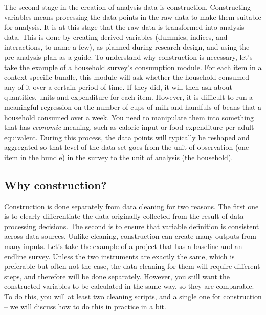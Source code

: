 The second stage in the creation of analysis data is construction.
Constructing variables means processing the data points in the raw data to make them suitable for analysis.
It is at this stage that the raw data is transformed into analysis data.
This is done by creating derived variables (dummies, indices, and interactions, to name a few), 
as planned during research design, 
and using the pre-analysis plan as a guide.
To understand why construction is necessary,
let's take the example of a household survey's consumption module.
For each item in a context-specific bundle, 
this module will ask whether the household consumed any of it over a certain period of time.
If they did, it will then ask about quantities, units and expenditure for each item.
However, it is difficult to run a meaningful regression 
on the number of cups of milk and handfuls of beans that a household consumed over a week.
You need to manipulate them into something that has \textit{economic} meaning,
such as caloric input or food expenditure per adult equivalent. 
During this process, the data points will typically be reshaped and aggregated 
so that level of the data set goes from the unit of observation 
(one item in the bundle) in the survey to the unit of analysis (the household). 

\subsection{Why construction?}

Construction is done separately from data cleaning for two reasons. 
The first one is to clearly differentiate the data originally collected 
from the result of data processing decisions.
The second is to ensure that variable definition is consistent across data sources. 
Unlike cleaning, construction can create many outputs from many inputs. 
Let's take the example of a project that has a baseline and an endline survey. 
Unless the two instruments are exactly the same, 
which is preferable but often not the case, 
the data cleaning for them will require different steps, 
and therefore will be done separately. 
However, you still want the constructed variables to be calculated in the same way, so they are comparable.
To do this, you will at least two cleaning scripts, 
and a single one for construction --
we will discuss how to do this in practice in a bit.

